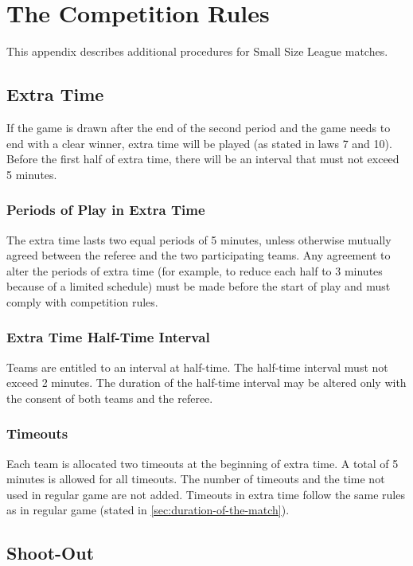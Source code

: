 \section{The Competition Rules}\label{app:competition-rules}

This appendix describes additional procedures for Small Size League matches.

\subsection{Extra Time}
If the game is drawn after the end of the second period and the game needs to end with a clear winner, extra time will be played (as stated in laws 7 and 10).
Before the first half of extra time, there will be an interval that must not exceed 5 minutes.

\subsubsection{Periods of Play in Extra Time}
The extra time lasts two equal periods of 5 minutes, unless otherwise mutually agreed between the referee and the two participating teams.
Any agreement to alter the periods of extra time (for example, to reduce each half to 3 minutes because of a limited schedule) must be made before the start of play and must comply with competition rules.

\subsubsection{Extra Time Half-Time Interval}
Teams are entitled to an interval at half-time.
The half-time interval must not exceed 2 minutes.
The duration of the half-time interval may be altered only with the consent of both teams and the referee.

\subsubsection{Timeouts}
Each team is allocated two timeouts at the beginning of extra time.
A total of 5 minutes is allowed for all timeouts.
The number of timeouts and the time not used in regular game are not added.
Timeouts in extra time follow the same rules as in regular game (stated in \autoref{sec:duration-of-the-match}).

\subsection{Shoot-Out}


